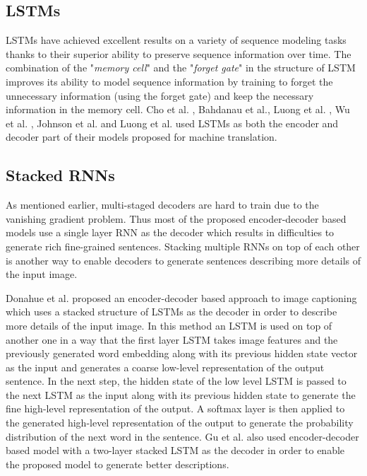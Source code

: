 \documentclass[preprint, 10pt]{elsarticle}
\begin{document}
		\subsection{LSTMs}
		LSTMs have achieved excellent results on a variety of sequence modeling tasks thanks to their superior ability to preserve sequence information over time. The combination of the "\textit{memory cell}" and the "\textit{forget gate}" in the structure of LSTM improves its ability to model sequence information by training to forget the unnecessary information (using the forget gate) and keep the necessary information in the memory cell. Cho et al. \cite{cho2014learning}, Bahdanau et al.\cite{bahdanau2014neural}, Luong et al. \cite{luong2015effective}, Wu et al. \cite{wu2016google}, Johnson et al. \cite{johnson2017google} and Luong et al. \cite{luong2014addressing} used LSTMs as both the encoder and decoder part of their models proposed for machine translation.
		\subsection{Stacked RNNs}
		As mentioned earlier, multi-staged decoders are hard to train due to the vanishing gradient problem. Thus most of the proposed encoder-decoder based models use a single layer RNN as the decoder which results in difficulties to generate rich fine-grained sentences. Stacking multiple RNNs on top of each other is another way to enable decoders to generate sentences describing more details of the input image.
		
		Donahue et al. \cite{donahue2015long} proposed an encoder-decoder based approach to image captioning which uses a stacked structure of LSTMs as the decoder in order to describe more details of the input image. In this method an LSTM is used on top of another one in a way that the first layer LSTM takes image features and the previously generated word embedding along with its previous hidden state vector as the input and generates a coarse low-level representation of the output sentence. In the next step, the hidden state of the low level LSTM is passed to the next LSTM as the input along with its previous hidden state to generate the fine high-level representation of the output. A softmax layer is then applied to the generated high-level representation of the output to generate the probability distribution of the next word in the sentence. Gu et al. \cite{gu2018stack} also used encoder-decoder based model with a two-layer stacked LSTM as the decoder in order to enable the proposed model to generate better descriptions.
		
\end{document}
